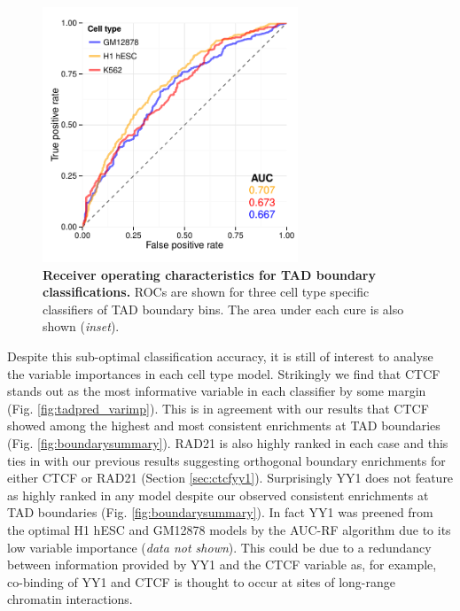\documentclass[a4paper,11pt,oneside]{book}
\begin{document}
\begin{figure}
\begin{center} 
\includegraphics[width=3in]{tadpred_auroc.pdf}
\captionsetup{width=\textwidth}
\caption[ Receiver operating characteristics for TAD boundary classifications. ]{ {\bf Receiver operating characteristics for TAD boundary classifications. }
ROCs are shown for three cell type specific classifiers of TAD boundary bins. The area under each cure is also shown (\emph{inset}).
}\label{fig:tadpred_auroc}
\end{center}
\end{figure} 

Despite this sub-optimal classification accuracy, it is still of interest to analyse the variable importances in each cell type model. Strikingly we find that CTCF stands out as the most informative variable in each classifier by some margin (Fig. \ref{fig:tadpred_varimp}). This is in agreement with our results that CTCF showed among the highest and most consistent enrichments at TAD boundaries (Fig. \ref{fig:boundarysummary}). RAD21 is also highly ranked in each case and this ties in with our previous results suggesting orthogonal boundary enrichments for either CTCF or RAD21 (Section \ref{sec:ctcfyy1}). Surprisingly YY1 does not feature as highly ranked in any model despite our observed consistent enrichments at TAD boundaries (Fig. \ref{fig:boundarysummary}). In fact YY1 was preened from the optimal H1 hESC and GM12878 models by the AUC-RF algorithm due to its low variable importance (\emph{data not shown}). This could be due to a redundancy between information provided by YY1 and the CTCF variable as, for example, co-binding of YY1 and CTCF is thought to occur at sites of long-range chromatin interactions.\cite{Atchison2014} 
\end{document}
